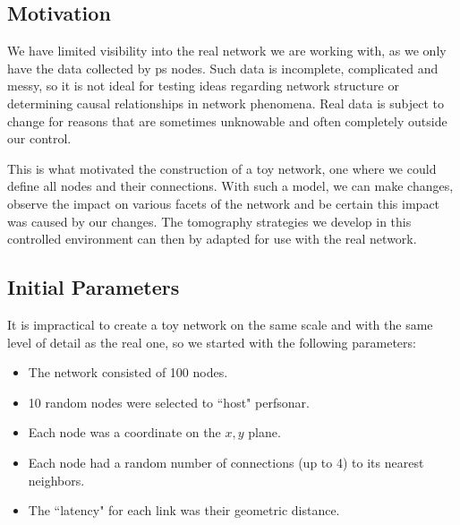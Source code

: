 \documentclass{finalreport}
\begin{document}
\subsection{Motivation}

We have limited visibility into the real network we are working with, as we only have the data collected by \gls{ps} nodes. Such data is incomplete, complicated and messy, so it is not ideal for testing ideas regarding network structure or determining causal relationships in network phenomena. Real data is subject to change for reasons that are sometimes unknowable and often completely outside our control.

This is what motivated the construction of a toy network, one where we could define all nodes and their connections. With such a model, we can make changes, observe the impact on various facets of the network and be certain this impact was caused by our changes. The \gls{tomography} strategies we develop in this controlled environment can then by adapted for use with the real network.

\subsection{Initial Parameters}

It is impractical to create a toy network on the same scale and with the same level of detail as the real one, so we started with the following parameters:

\begin{itemize}
	\item The network consisted of 100 \glspl{node}.
	\item 10 random nodes were selected to ``host" \gls{perfsonar}.
    \item Each node was a coordinate on the $x,y$ plane.
	\item Each node had a random number of connections (up to 4) to its nearest neighbors.
	\item The ``\gls{latency}" for each link was their geometric distance.
\end{itemize}
\end{document}
